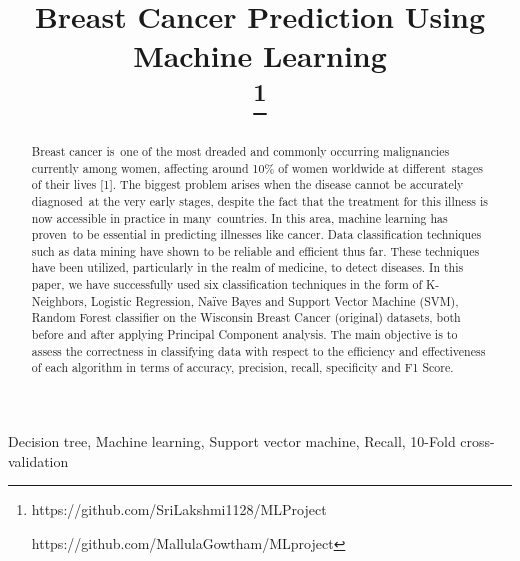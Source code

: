\documentclass[conference]{IEEEtran}
\begin{document}
\title{Breast Cancer  Prediction Using Machine  Learning \\
{\footnotesize \textsuperscript{}}
\thanks{https://github.com/SriLakshmi1128/MLProject


https://github.com/MallulaGowtham/MLproject}
}

\author{

\and
{}

}

\maketitle

\begin{abstract}
Breast cancer is one of the most dreaded and commonly occurring malignancies currently among women, affecting around 10\% of women worldwide at different stages of their lives [1]. The biggest problem arises when the disease cannot be accurately diagnosed at the very early stages, despite the fact that the treatment for this illness is now accessible in practice in many countries. In this area, machine learning has proven to be essential in predicting illnesses like cancer. Data classification techniques such as data mining have shown to be reliable and efficient thus far. These techniques have been utilized, particularly in the realm of medicine, to detect diseases.  In this paper, we have successfully used six classification techniques in the form of  K-Neighbors, Logistic Regression, Naïve Bayes and Support Vector Machine (SVM), Random Forest classifier on the Wisconsin Breast Cancer (original) datasets, both before and after applying Principal Component 
analysis. The main objective is to assess the correctness in classifying data with respect to the efficiency and effectiveness of each algorithm in terms of accuracy, precision, recall, specificity and F1 Score. 
\end{abstract}

\begin{IEEEkeywords}
Decision tree, Machine learning, Support vector machine, Recall, 10-Fold cross-validation
\end{IEEEkeywords}
\end{document}
